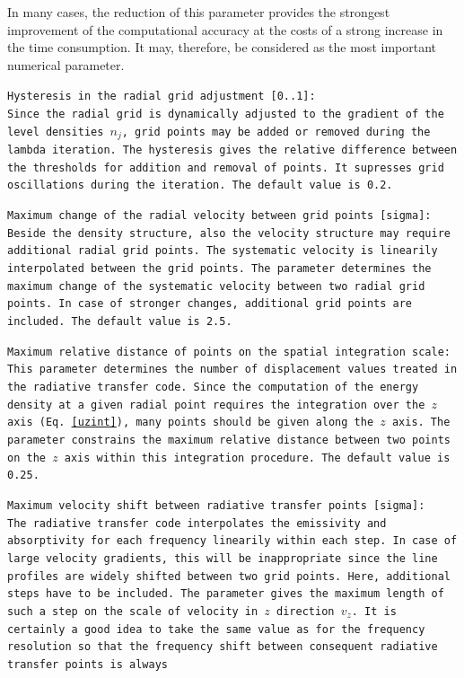 \begin{description}
In many cases, the reduction of this parameter provides the strongest
improvement of the computational accuracy at the costs of a strong
increase in the time consumption. It may, therefore, be considered as 
the most important numerical parameter.
\item{}\tt Hysteresis in the radial grid adjustment [0..1]:\\ \rm
Since the radial grid is dynamically adjusted to the gradient of the
level densities $n_j$, grid points may be added or removed during the
lambda iteration. The hysteresis gives the relative difference between
the thresholds for addition and removal of points. It
supresses grid oscillations during the iteration.
The default value is 0.2.
\item{}\tt Maximum change of the radial velocity between grid points [sigma]:
\\ \rm
Beside the density structure, also the velocity structure may require
additional radial grid points. The systematic velocity is linearily interpolated
between the grid points. The parameter determines the maximum change
of the systematic velocity between two radial grid points. In case
of stronger changes, additional grid points are included.
The default value is 2.5.
\item{}\tt Maximum relative distance of points on the spatial integration scale:
\\ \rm
This parameter determines the number of displacement values treated
in the radiative transfer code. Since the computation of the energy density
at a given radial point requires the integration over the $z$ axis (Eq.\ 
\ref{uzint}), many points should be given along the $z$ axis. The parameter
constrains the maximum relative distance between two points on the $z$ axis
within this integration procedure.
The default value is 0.25.
\item{}\tt Maximum velocity shift between radiative transfer points [sigma]:
\\ \rm
The radiative transfer code interpolates the emissivity and absorptivity
for each frequency linearily within each step. In case of large velocity 
gradients, this will be inappropriate since the line profiles are
widely shifted between two grid points. Here, additional steps have to
be included. The parameter gives the maximum length of such a step on
the scale of velocity in $z$ direction $v_z$. It is certainly a good idea
to take the same value as for the frequency resolution so that the
frequency shift between consequent radiative transfer points is always

\end{description}
